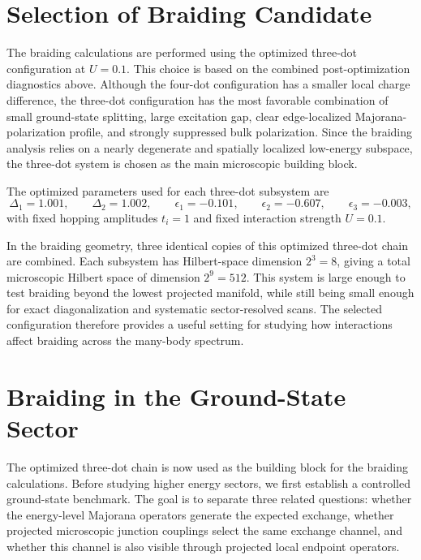 \section{Selection of Braiding Candidate}
The braiding calculations are performed using the optimized three-dot configuration at $U=0.1$. This choice is based on the combined post-optimization diagnostics above. Although the four-dot configuration has a smaller local charge difference, the three-dot configuration has the most favorable combination of small ground-state splitting, large excitation gap, clear edge-localized Majorana-polarization profile, and strongly suppressed bulk polarization. Since the braiding analysis relies on a nearly degenerate and spatially localized low-energy subspace, the three-dot system is chosen as the main microscopic building block.

The optimized parameters used for each three-dot subsystem are
\begin{equation}
\Delta_1=1.001,\qquad
\Delta_2=1.002,\qquad
\epsilon_1=-0.101,\qquad
\epsilon_2=-0.607,\qquad
\epsilon_3=-0.003,
\end{equation}
with fixed hopping amplitudes $t_i=1$ and fixed interaction strength $U=0.1$.
 
In the braiding geometry, three identical copies of this optimized three-dot chain are combined. Each subsystem has Hilbert-space dimension $2^3=8$, giving a total microscopic Hilbert space of dimension $2^9=512$. This system is large enough to test braiding beyond the lowest projected manifold, while still being small enough for exact diagonalization and systematic sector-resolved scans. The selected configuration therefore provides a useful setting for studying how interactions affect braiding across the many-body spectrum.

\section{Braiding in the Ground-State Sector}
The optimized three-dot chain is now used as the building block for the braiding calculations. Before studying higher energy sectors, we first establish a controlled ground-state benchmark. The goal is to separate three related questions: whether the energy-level Majorana operators generate the expected exchange, whether projected microscopic junction couplings select the same exchange channel, and whether this channel is also visible through projected local endpoint operators.


